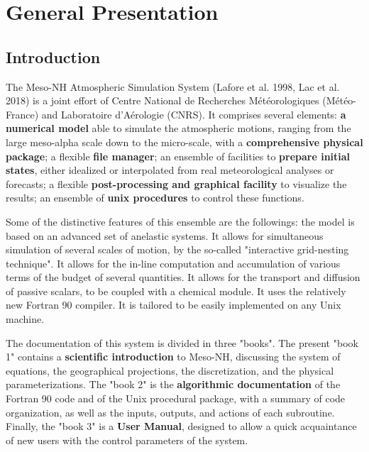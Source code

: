 %
%
%
%

\chapter{General Presentation}

\minitoc


\section{Introduction}
The Meso-NH Atmospheric Simulation System (Lafore et al. 1998, Lac et al. 2018)
is a joint effort of Centre National de
Recherches M\'et\'eorologiques (M\'et\'eo-France) and Laboratoire d'A\'erologie
(CNRS). It comprises several elements:
{\bf a numerical model} able to simulate the atmospheric
motions, ranging from the large meso-alpha scale down to the micro-scale,
with a {\bf comprehensive physical package}; a flexible {\bf file manager};
 an ensemble of facilities to {\bf prepare
initial states}, either idealized or interpolated from real meteorological
analyses or forecasts;
a flexible {\bf post-processing and graphical facility}
 to visualize the results;
an ensemble of {\bf unix procedures} to control these functions.

 Some of the distinctive features of this ensemble are the followings:
the model is based on an advanced set of anelastic systems.
 It allows for simultaneous
 simulation of several scales of motion, by the
so-called  "interactive grid-nesting technique". It allows for the in-line
computation and accumulation of various terms of the budget of several
quantities. It allows for the transport and diffusion of passive scalars,
to be coupled with a chemical module. It uses the relatively new Fortran 90
compiler. It is tailored to be easily implemented on any Unix machine.

The documentation of this system is divided in three "books". The present
"book 1" contains a {\bf scientific introduction} to Meso-NH, discussing the
system of equations, the geographical projections, the discretization, and
the physical parameterizations. The "book 2" is the {\bf algorithmic
documentation}
of the Fortran 90 code and of the Unix procedural package, with a summary
of code organization, as well as the inputs, outputs, and actions of each
subroutine. Finally, the "book 3" is a {\bf User Manual}, designed to allow
a quick acquaintance of new users with the control parameters of the system.


